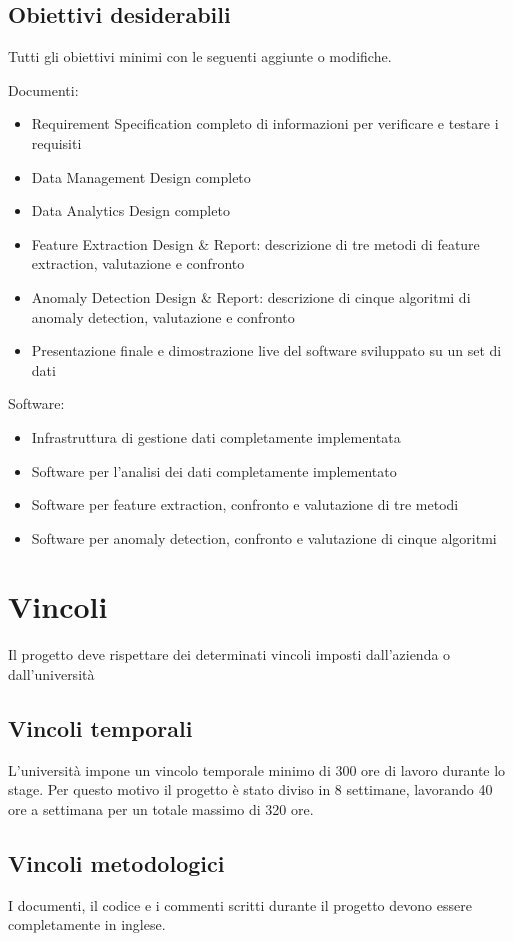 \subsection{Obiettivi desiderabili}
Tutti gli obiettivi minimi con le seguenti aggiunte o modifiche.

Documenti:
\begin{itemize}
	\item Requirement Specification completo di informazioni per verificare e testare i
	requisiti
	\item Data Management Design completo
	\item Data Analytics Design completo
	\item Feature Extraction Design \& Report: descrizione di tre metodi di feature extraction, valutazione e confronto
	\item Anomaly Detection Design \& Report: descrizione di cinque algoritmi di anomaly detection, valutazione e confronto
	\item Presentazione finale e dimostrazione live del software sviluppato su un set di dati
\end{itemize}
Software:
\begin{itemize}
	\item Infrastruttura di gestione dati completamente implementata
	\item Software per l'analisi dei dati completamente implementato
	\item Software per feature extraction, confronto e valutazione di tre metodi
	\item Software per anomaly detection, confronto e valutazione di cinque algoritmi
\end{itemize}


\section{Vincoli}
Il progetto deve rispettare dei determinati vincoli imposti dall'azienda o dall'università

\subsection{Vincoli temporali}
L'università impone un vincolo temporale minimo di 300 ore di lavoro durante lo stage. Per questo motivo il progetto è stato diviso in 8 settimane, lavorando 40 ore a settimana per un totale massimo di 320 ore.

\subsection{Vincoli metodologici}
I documenti, il codice e i commenti scritti durante il progetto devono essere completamente in inglese.

